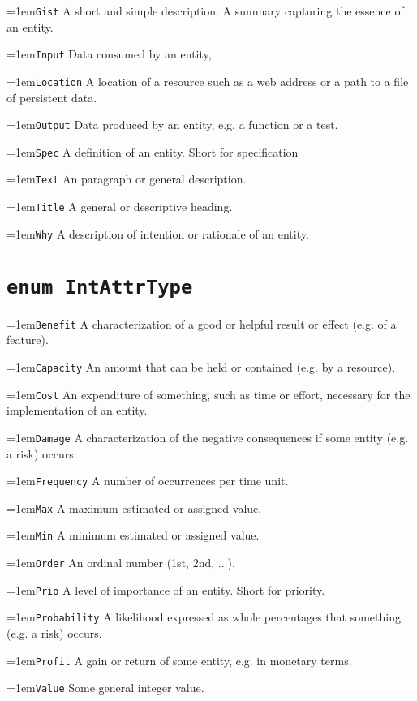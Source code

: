 \documentclass[a4paper,oneside]{article}
\begin{document}
\begin{multicols*}{4}
\hangindent=1em\lstinline+Gist+ A short and simple description. A summary capturing the essence of an entity. 

\hangindent=1em\lstinline+Input+ Data consumed by an entity,  

\hangindent=1em\lstinline+Location+ A location of a resource such as a web address or a path to a file of persistent data. 

\hangindent=1em\lstinline+Output+ Data produced by an entity, e.g. a function or a test. 

\hangindent=1em\lstinline+Spec+ A definition of an entity. Short for specification 

\hangindent=1em\lstinline+Text+ An paragraph or general description. 

\hangindent=1em\lstinline+Title+ A general or descriptive heading. 

\hangindent=1em\lstinline+Why+ A description of intention or rationale of an entity. 


\section*{\texttt{enum IntAttrType}}
\hangindent=1em\lstinline+Benefit+ A characterization of a good or helpful result or effect (e.g. of a feature). 

\hangindent=1em\lstinline+Capacity+ An amount that can be held or contained (e.g. by a resource). 

\hangindent=1em\lstinline+Cost+ An expenditure of something, such as time or effort, necessary for the implementation of an entity. 

\hangindent=1em\lstinline+Damage+ A characterization of the negative consequences if some entity (e.g. a risk) occurs. 

\hangindent=1em\lstinline+Frequency+ A number of occurrences per time unit.  

\hangindent=1em\lstinline+Max+ A maximum estimated or assigned value. 

\hangindent=1em\lstinline+Min+ A minimum estimated or assigned value. 

\hangindent=1em\lstinline+Order+ An ordinal number (1st, 2nd, ...). 

\hangindent=1em\lstinline+Prio+ A level of importance of an entity. Short for priority. 

\hangindent=1em\lstinline+Probability+ A likelihood expressed as whole percentages that something (e.g. a risk) occurs. 

\hangindent=1em\lstinline+Profit+ A gain or return of some entity, e.g. in monetary terms. 

\hangindent=1em\lstinline+Value+ Some general integer value. 
 

\end{multicols*}
\end{document}
